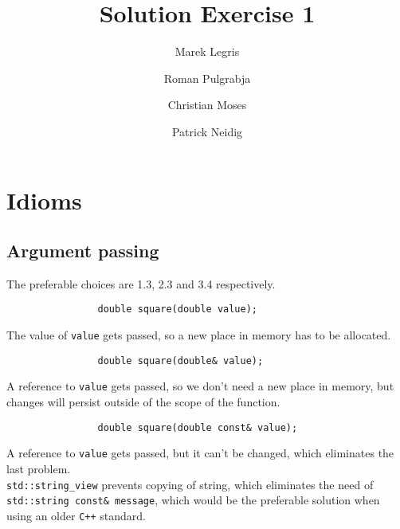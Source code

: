 \documentclass{article}
\title{Solution Exercise 1}
\author{
    Marek Legris \and
    Roman Pulgrabja \and
    Christian Moses \and
    Patrick Neidig
}
\begin{document}
    \maketitle

    \lstset{language=C++}

    \section{Idioms}
        \subsection{Argument passing}
            The preferable choices are 1.3, 2.3 and 3.4 respectively.\\

            \begin{lstlisting}
                double square(double value);
            \end{lstlisting}
            The value of \verb|value| gets passed, so a new place in memory has to be allocated.\\
            
            \begin{lstlisting}
                double square(double& value);
            \end{lstlisting}
            A reference to \verb|value| gets passed, so we don't need a new place in memory, but changes will persist outside of the scope of the function.\\

            \begin{lstlisting}
                double square(double const& value);
            \end{lstlisting}
            A reference to \verb|value| gets passed, but it can't be changed, which eliminates the last problem.\\

            \verb|std::string_view| prevents copying of string, which eliminates the need of \verb|std::string const& message|, which would be the preferable solution when using an older \verb|C++| standard.\\
\end{document}
